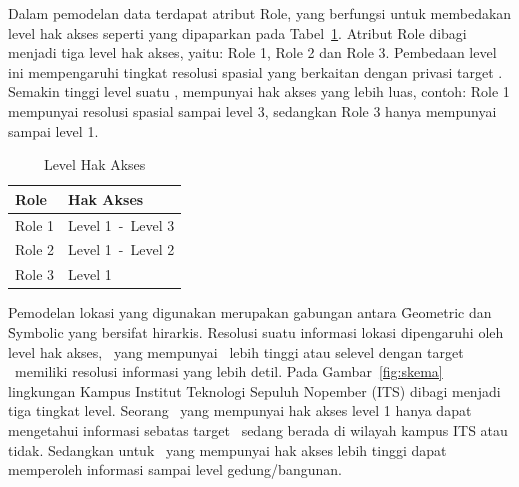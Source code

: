 Dalam pemodelan data terdapat atribut Role, yang berfungsi untuk membedakan
level hak akses seperti yang dipaparkan pada Tabel~\ref{tab:level}. Atribut
Role dibagi menjadi tiga level hak akses, yaitu: Role 1, Role 2 dan Role 3.
Pembedaan level ini mempengaruhi tingkat resolusi spasial yang berkaitan dengan
privasi target \tracking. Semakin tinggi level suatu \Role, mempunyai hak akses
yang lebih luas, contoh: Role 1 mempunyai resolusi spasial sampai level 3, sedangkan
Role 3 hanya mempunyai sampai level 1.

\begin{table}
\centering
\caption{Level Hak Akses}
\label{tab:level}
\begin{tabular}{l l}
   \hline
   Role     & Hak Akses     \\
   \hline
   Role 1   & Level 1~-~Level 3 \\
   Role 2   & Level 1~-~Level 2 \\
   Role 3   & Level 1 \\
   \hline
\end{tabular}
\end{table}

Pemodelan lokasi yang digunakan merupakan gabungan antara \f{Geometric} dan
\f{Symbolic} yang bersifat hirarkis. Resolusi suatu informasi lokasi
dipengaruhi oleh level hak akses, \tracker~yang mempunyai \Role~lebih tinggi
atau selevel dengan target \tracking~memiliki resolusi informasi yang lebih
detil.  Pada Gambar~\ref{fig:skema} lingkungan Kampus Institut Teknologi
Sepuluh Nopember (ITS) dibagi menjadi tiga tingkat level. Seorang \tracker~yang
mempunyai hak akses level 1 hanya dapat mengetahui informasi sebatas target
\tracking~sedang berada di wilayah kampus ITS atau tidak. Sedangkan untuk
\tracker~yang mempunyai hak akses lebih tinggi dapat memperoleh informasi
sampai level gedung/bangunan.

